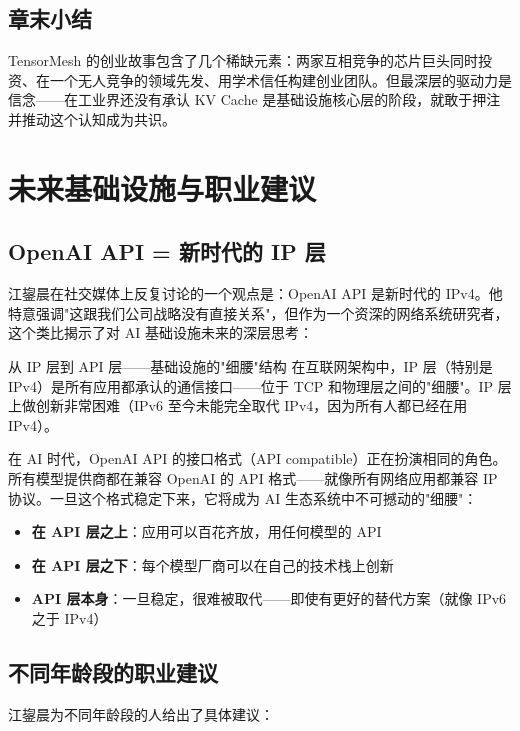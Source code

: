 \documentclass[a4paper]{article}
\begin{document}
\subsection{章末小结}

TensorMesh 的创业故事包含了几个稀缺元素：两家互相竞争的芯片巨头同时投资、在一个无人竞争的领域先发、用学术信任构建创业团队。但最深层的驱动力是信念——在工业界还没有承认 KV Cache 是基础设施核心层的阶段，就敢于押注并推动这个认知成为共识。

\section{未来基础设施与职业建议}

\subsection{OpenAI API = 新时代的 IP 层}

江鋆晨在社交媒体上反复讨论的一个观点是：OpenAI API 是新时代的 IPv4。他特意强调"这跟我们公司战略没有直接关系"，但作为一个资深的网络系统研究者，这个类比揭示了对 AI 基础设施未来的深层思考：

\begin{importantbox}{从 IP 层到 API 层——基础设施的"细腰"结构}
在互联网架构中，IP 层（特别是 IPv4）是所有应用都承认的通信接口——位于 TCP 和物理层之间的"细腰"。IP 层上做创新非常困难（IPv6 至今未能完全取代 IPv4，因为所有人都已经在用 IPv4）。

在 AI 时代，OpenAI API 的接口格式（API compatible）正在扮演相同的角色。所有模型提供商都在兼容 OpenAI 的 API 格式——就像所有网络应用都兼容 IP 协议。一旦这个格式稳定下来，它将成为 AI 生态系统中不可撼动的"细腰"：
\begin{itemize}
\item \textbf{在 API 层之上}：应用可以百花齐放，用任何模型的 API
\item \textbf{在 API 层之下}：每个模型厂商可以在自己的技术栈上创新
\item \textbf{API 层本身}：一旦稳定，很难被取代——即使有更好的替代方案（就像 IPv6 之于 IPv4）
\end{itemize}
\end{importantbox}

\subsection{不同年龄段的职业建议}

江鋆晨为不同年龄段的人给出了具体建议：
\end{document}
